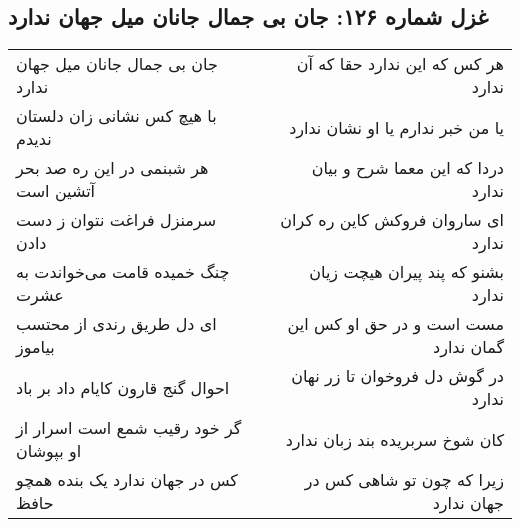 \begin{center}
\section*{غزل شماره ۱۲۶: جان بی جمال جانان میل جهان ندارد}
\label{sec:sh126}
\begin{longtable}{l p{0.5cm} r}
جان بی جمال جانان میل جهان ندارد
&&
هر کس که این ندارد حقا که آن ندارد
\\
با هیچ کس نشانی زان دلستان ندیدم
&&
یا من خبر ندارم یا او نشان ندارد
\\
هر شبنمی در این ره صد بحر آتشین است
&&
دردا که این معما شرح و بیان ندارد
\\
سرمنزل فراغت نتوان ز دست دادن
&&
ای ساروان فروکش کاین ره کران ندارد
\\
چنگ خمیده قامت می‌خواندت به عشرت
&&
بشنو که پند پیران هیچت زیان ندارد
\\
ای دل طریق رندی از محتسب بیاموز
&&
مست است و در حق او کس این گمان ندارد
\\
احوال گنج قارون کایام داد بر باد
&&
در گوش دل فروخوان تا زر نهان ندارد
\\
گر خود رقیب شمع است اسرار از او بپوشان
&&
کان شوخ سربریده بند زبان ندارد
\\
کس در جهان ندارد یک بنده همچو حافظ
&&
زیرا که چون تو شاهی کس در جهان ندارد
\\
\end{longtable}
\end{center}
